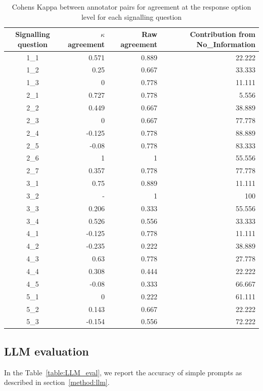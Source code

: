 \documentclass[sn-mathphys,Numbered]{sn-jnl}%
\theoremstyle{thmstyleone}%
\theoremstyle{thmstyletwo}%
\theoremstyle{thmstylethree}%
\begin{document}
%
%
%
\begin{table}[]
    \caption{Cohens Kappa between annotator pairs for agreement at the response option level for each signalling question}
    \label{tab:IAA_response}
    \begin{tabular}{crrr}
        \hline
        Signalling question & $\kappa$ agreement & Raw agreement & Contribution from No\_Information \\
        \hline
        1\_1 & 0.571 & 0.889 & 22.222 \\
        1\_2 & 0.25 & 0.667 & 33.333 \\
        1\_3 & 0 & 0.778 & 11.111 \\
        2\_1 & 0.727 & 0.778 & 5.556 \\
        2\_2 & 0.449 & 0.667 & 38.889 \\
        2\_3 & 0 & 0.667 & 77.778 \\
        2\_4 & -0.125 & 0.778 & 88.889 \\
        2\_5 & -0.08 & 0.778 & 83.333 \\
        2\_6 & 1 & 1 & 55.556 \\
        2\_7 & 0.357 & 0.778 & 77.778 \\
        3\_1 & 0.75 & 0.889 & 11.111 \\
        3\_2 & - & 1 & 100 \\
        3\_3 & 0.206 & 0.333 & 55.556 \\
        3\_4 & 0.526 & 0.556 & 33.333 \\
        4\_1 & -0.125 & 0.778 & 11.111 \\
        4\_2 & -0.235 & 0.222 & 38.889 \\
        4\_3 & 0.63 & 0.778 & 27.778 \\
        4\_4 & 0.308 & 0.444 & 22.222 \\
        4\_5 & -0.08 & 0.333 & 66.667 \\
        5\_1 & 0 & 0.222 & 61.111 \\
        5\_2 & 0.143 & 0.667 & 22.222 \\
        5\_3 & -0.154 & 0.556 & 72.222 \\
        \hline
    \end{tabular}
\end{table}

%
%
%
\subsection{LLM evaluation}
%
In the Table~\ref{table:LLM_eval}, we report the accuracy of simple prompts as described in section~\ref{method:llm}.
\end{document}
